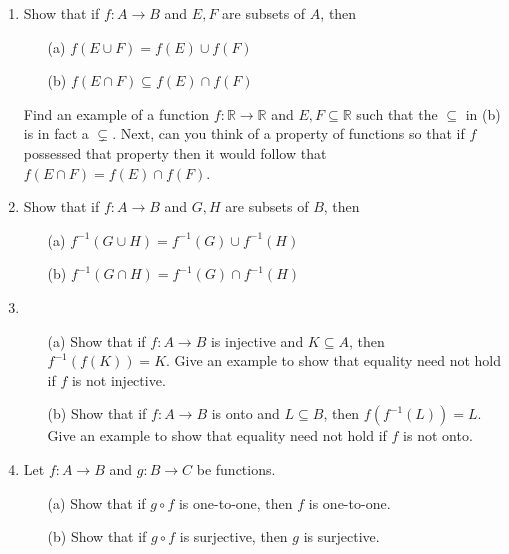 \documentclass[12pt]{article}
\begin{document}
\begin{enumerate}
    \item Show that if $f:A \to B$ and $E, F$ are subsets of $A$, then
    \begin{itemize}
        \item[(a)] $f(E \cup F) = f(E) \cup f(F)$
        \item[(b)] $f(E \cap F) \subseteq f(E) \cap f(F)$
    \end{itemize}    
    Find an example of a function $f: \mathbb{R} \to \mathbb{R}$ and $E, F \subseteq \mathbb{R}$ such that the $\subseteq$ in (b) is in fact a $\subsetneq$. Next, can you think of a property of functions so that if $f$ possessed that property then it would follow that $f(E \cap F) = f(E) \cap f(F)$.

    \item Show that if $f:A \to B$ and $G, H$ are subsets of $B$, then
    \begin{itemize}
        \item[(a)] $f^{-1}(G \cup H) = f^{-1}(G) \cup f^{-1}(H)$
        \item[(b)] $f^{-1}(G \cap H) = f^{-1}(G) \cap f^{-1}(H)$
    \end{itemize}  

    \item 
    \begin{itemize}
        \item[(a)] Show that if $f : A \to B$ is injective and $K \subseteq A$, then $f^{-1}(f(K))=K$. Give an example to show that equality need not hold if $f$ is not injective.
        \item[(b)]  Show that if $f : A \to B$ is onto and $L \subseteq B$, then $f(f^{-1}(L))=L$. Give an example to show that equality need not hold if $f$ is not onto.
    \end{itemize}
        
    \item Let $f : A \to B$ and $g : B \to C$ be functions.
    \begin{itemize}
        \item[(a)] Show that if $g \circ f$ is one-to-one, then $f$ is one-to-one.
        \item[(b)] Show that if $g \circ f$ is surjective, then $g$ is surjective.
    \end{itemize}


\end{enumerate}
\end{document}
